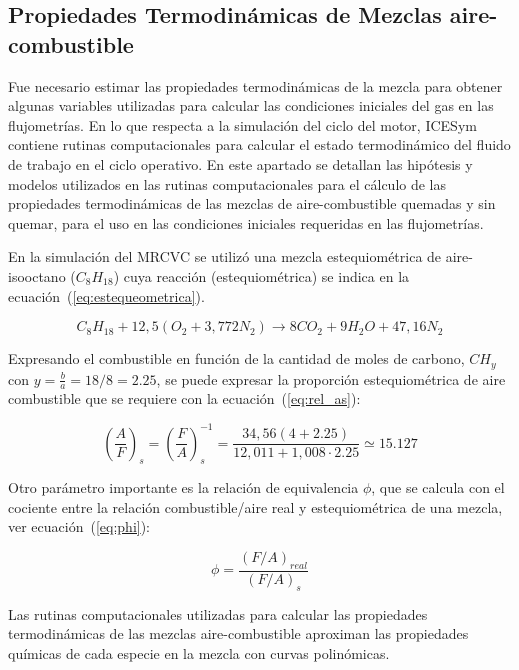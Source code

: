 \subsection{Propiedades Termodinámicas de Mezclas aire-combustible}\label{subsec:prop_mezcla}
%
Fue necesario estimar las propiedades termodinámicas de la mezcla para obtener
algunas variables utilizadas para calcular las condiciones iniciales del gas en
las flujometrías.
%
En lo que respecta a la simulación del ciclo del motor, ICESym contiene rutinas
computacionales para calcular el estado termodinámico del fluido de trabajo en
el ciclo operativo.
%
En este apartado se detallan las hipótesis y modelos utilizados en las rutinas
computacionales para el cálculo de las propiedades termodinámicas de las mezclas
de aire-combustible quemadas y sin quemar, para el uso en las condiciones
iniciales requeridas en las flujometrías.

En la simulación del MRCVC se utilizó una mezcla estequiométrica de
aire-isooctano ($C_{8}H_{18}$) cuya reacción (estequiométrica) se indica en la
ecuación~(\ref{eq:estequeometrica}).

\begin{equation} \label{eq:estequeometrica}
  C_{8}H_{18} + 12,5 \left(O_{2}+3,772N_{2}\right) \rightarrow 8 CO_{2} + 9 H_{2}O + 47,16 N_{2}
\end{equation}

Expresando el combustible en función de la cantidad de moles de carbono,
$CH_{y}$ con $y=\frac{b}{a}=18/8=2.25$, se puede expresar la proporción
estequiométrica de aire combustible que se requiere con la
ecuación~(\ref{eq:rel_as}):

\begin{equation} \label{eq:rel_as}
  \left(\frac{A}{F}\right)_{s} = \left(\frac{F}{A}\right)_{s}^{-1} = \frac{34,56(4+2.25)}{12,011 + 1,008\cdot 2.25} \simeq 15.127
\end{equation}

Otro parámetro importante es la relación de equivalencia $\phi$, que se calcula
con el cociente entre la relación combustible/aire real y estequiométrica de una
mezcla, ver ecuación~(\ref{eq:phi}):

\begin{equation}\label{eq:phi}
  \phi = \frac{{(F/A)}_{real}}{{(F/A)}_{s}}
\end{equation}

Las rutinas computacionales utilizadas para calcular las propiedades
termodinámicas de las mezclas aire-combustible aproximan las propiedades
químicas de cada especie en la mezcla con curvas polinómicas.

